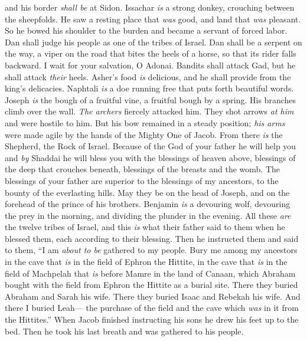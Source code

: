 \begin{biblechapter}
and his border \textit{shall be} at Sidon.
\verse Issachar \textit{is} a strong donkey, 
crouching between the sheepfolds.
\verse He saw a resting place that \textit{was} good, 
and land that \textit{was} pleasant. 
So he bowed his shoulder to the burden 
and became a servant of forced labor.
\verse Dan shall judge his people 
as one of the tribes of Israel.
\verse Dan shall be a serpent on the way, 
a viper on the road 
that bites the heels of a horse, 
so that its rider falls backward.
\verse I wait for your salvation, O Adonai.
\verse Bandits shall attack Gad, 
but he shall attack \textit{their} heels.
\verse Asher’s food \textit{is} delicious, 
and he shall provide from the king’s delicacies.
\verse Naphtali \textit{is} a doe running free 
that puts forth beautiful words.
\verse Joseph \textit{is} the bough of a fruitful vine, 
a fruitful bough by a spring. 
His branches climb over the wall.
\verse \textit{The archers} fiercely attacked him. 
They shot arrows \textit{at him} and were hostile to him.
\verse But his bow remained in a steady position; 
\textit{his arms} were made agile 
by the hands of the Mighty One of Jacob. 
From there \textit{is} the Shepherd, the Rock of Israel.
\verse Because of the God of your father he will help you 
and \textit{by} Shaddai he will bless you 
with the blessings of heaven above, 
blessings of the deep that crouches beneath, 
blessings of the breasts and the womb.
\verse The blessings of your father 
are superior to the blessings of my ancestors, 
to the bounty of the everlasting hills. 
May they be on the head of Joseph, 
and on the forehead of the prince of his brothers.
\verse Benjamin \textit{is} a devouring wolf, 
devouring the prey in the morning, 
and dividing the plunder in the evening.
 All these \textit{are} the twelve tribes of Israel, and this \textit{is} what their father said to them when he blessed them, each according to their blessing.
\verse Then he instructed them and said to them, “I am \textit{about to be} gathered to my people. Bury me among my ancestors in the cave that \textit{is} in the field of Ephron the Hittite,
\verse in the cave that \textit{is} in the field of Machpelah that \textit{is} before Mamre in the land of Canaan, which Abraham bought with the field from Ephron the Hittite as a burial site.
\verse There they buried Abraham and Sarah his wife. There they buried Isaac and Rebekah his wife. And there I buried Leah—
\verse the purchase of the field and the cave which \textit{was} in it from the Hittites.”
\verse When Jacob finished instructing his sons he drew his feet up to the bed. Then he took his last breath and was gathered to his people.
\end{biblechapter}

